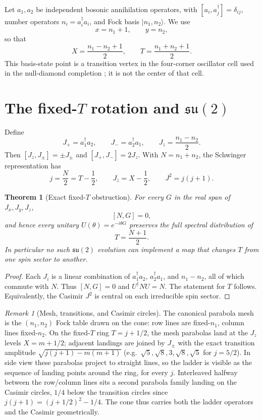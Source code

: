 \documentclass[11pt]{amsart}
\newtheorem{theorem}{Theorem}[section]
\theoremstyle{remark}
\newtheorem*{remark}{Remark}
\begin{document}
Let $a_1,a_2$ be independent bosonic annihilation operators, with $[a_i,a_j^\dagger]=\delta_{ij}$, number operators $n_i=a_i^\dagger a_i$, and Fock basis $|n_1,n_2\rangle$.  We use
\begin{equation}\label{eq:dictionary}
x=n_1+1,\qquad y=n_2,
\end{equation}
so that
\[
X=\frac{n_1-n_2+1}{2},\qquad T=\frac{n_1+n_2+1}{2}.
\]
This basis-state point is a transition vertex in the four-corner oscillator cell used in the null-diamond completion \cite{Ebert2026NullDiamond}; it is not the center of that cell.

\section{The fixed-$T$ rotation and $\mathfrak{su}(2)$}
Define
\[
J_+=a_1^\dagger a_2,\qquad J_-=a_2^\dagger a_1,\qquad J_z=\frac{n_1-n_2}{2}.
\]
Then $[J_z,J_\pm]=\pm J_\pm$ and $[J_+,J_-]=2J_z$.  With $N=n_1+n_2$, the Schwinger representation has
\[
j=\frac N2=T-\frac12,\qquad J_z=X-\frac12,\qquad J^2=j(j+1).
\]

\begin{theorem}[Exact fixed-$T$ obstruction]\label{thm:su2}
For every $G$ in the real span of $J_x,J_y,J_z$,
\[
[N,G]=0,
\]
and hence every unitary $U(\theta)=e^{-i\theta G}$ preserves the full spectral distribution of
\[
T=\frac{N+1}{2}.
\]
In particular no such $\mathfrak{su}(2)$ evolution can implement a map that changes $T$ from one spin sector to another.
\end{theorem}
\begin{proof}
Each $J_i$ is a linear combination of $a_1^\dagger a_2$, $a_2^\dagger a_1$, and $n_1-n_2$, all of which commute with $N$.  Thus $[N,G]=0$ and $U^\dagger N U=N$.  The statement for $T$ follows.  Equivalently, the Casimir $J^2$ is central on each irreducible spin sector.
\end{proof}

\begin{remark}[Mesh, transitions, and Casimir circles]
The canonical parabola mesh is the $(n_1,n_2)$ Fock table drawn on the cone: row lines are fixed-$n_1$, column lines fixed-$n_2$.  On the fixed-$T$ ring $T=j+1/2$, the mesh parabolas land at the $J_z$ levels $X=m+1/2$; adjacent landings are joined by $J_\pm$ with the exact transition amplitude $\sqrt{j(j+1)-m(m+1)}$ (e.g.\ $\sqrt5,\sqrt8,3,\sqrt8,\sqrt5$ for $j=5/2$).  In side view these parabolas project to straight lines, so the ladder is visible as the sequence of landing points around the ring, for every $j$.  Interleaved halfway between the row/column lines sits a second parabola family landing on the Casimir circles, $1/4$ below the transition circles since $j(j+1)=(j+1/2)^2-1/4$.  The cone thus carries both the ladder operators and the Casimir geometrically.
\end{remark}
\end{document}
